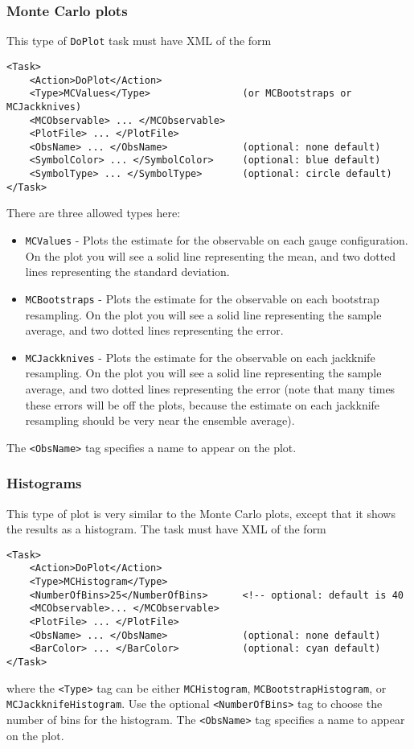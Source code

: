 \documentclass[12pt]{article}
\newcommand{\vb}{\texttt}
\begin{document}
\subsubsection{Monte Carlo plots}
This type of \vb{DoPlot} task must have XML of the form
\begin{verbatim}
<Task>
    <Action>DoPlot</Action>
    <Type>MCValues</Type>                (or MCBootstraps or MCJackknives)
    <MCObservable> ... </MCObservable>
    <PlotFile> ... </PlotFile>
    <ObsName> ... </ObsName>             (optional: none default)
    <SymbolColor> ... </SymbolColor>     (optional: blue default)
    <SymbolType> ... </SymbolType>       (optional: circle default)
</Task>
\end{verbatim}
There are three allowed types here:
\begin{itemize}
\item \vb{MCValues} - Plots the estimate for the observable on each gauge configuration. On the
  plot you will see a solid line representing the mean, and two dotted lines representing the
  standard deviation.
\item \vb{MCBootstraps} - Plots the estimate for the observable on each bootstrap resampling. On the
  plot you will see a solid line representing the sample average, and two dotted lines representing the
  error.
\item \vb{MCJackknives} - Plots the estimate for the observable on each jackknife resampling. On the
  plot you will see a solid line representing the sample average, and two dotted lines representing the
  error (note that many times these errors will be off the plots, because the estimate on each
  jackknife resampling should be very near the ensemble average).
\end{itemize}
The \vb{<ObsName>} tag specifies a name to appear on the plot.

\subsubsection{Histograms}
This type of plot is very similar to the Monte Carlo plots, except that it shows the results
as a histogram. The task must have XML of the form
\begin{verbatim}
<Task>
    <Action>DoPlot</Action>
    <Type>MCHistogram</Type>
    <NumberOfBins>25</NumberOfBins>      <!-- optional: default is 40
    <MCObservable>... </MCObservable>
    <PlotFile> ... </PlotFile>
    <ObsName> ... </ObsName>             (optional: none default)
    <BarColor> ... </BarColor>           (optional: cyan default)
</Task>
\end{verbatim}
where the \vb{<Type>} tag can be either \vb{MCHistogram}, \vb{MCBootstrapHistogram}, or
\vb{MCJackknifeHistogram}. Use the optional \vb{<NumberOfBins>} tag to
choose the number of bins for the histogram.
The \vb{<ObsName>} tag specifies a name to appear on the plot.
\end{document}
